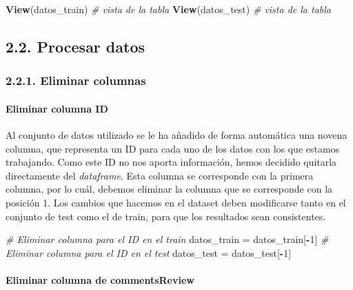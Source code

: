 \documentclass[spanish,]{article}
\newenvironment{Shaded}{\begin{snugshade}}{\end{snugshade}}
\newcommand{\CommentTok}[1]{\textcolor[rgb]{0.56,0.35,0.01}{\textit{#1}}}
\newcommand{\DecValTok}[1]{\textcolor[rgb]{0.00,0.00,0.81}{#1}}
\newcommand{\KeywordTok}[1]{\textcolor[rgb]{0.13,0.29,0.53}{\textbf{#1}}}
\newcommand{\NormalTok}[1]{#1}
\newcommand{\OperatorTok}[1]{\textcolor[rgb]{0.81,0.36,0.00}{\textbf{#1}}}
\newcommand{\StringTok}[1]{\textcolor[rgb]{0.31,0.60,0.02}{#1}}
\let\oldparagraph\paragraph
\renewcommand{\paragraph}[1]{\oldparagraph{#1}\mbox{}}
\begin{document}
\begin{Shaded}
\begin{Highlighting}[]
\KeywordTok{View}\NormalTok{(datos_train)    }\CommentTok{# vista de la tabla}
\KeywordTok{View}\NormalTok{(datos_test)    }\CommentTok{# vista de la tabla}
\end{Highlighting}
\end{Shaded}

\hypertarget{procesar-datos}{%
\subsection{2.2. Procesar datos}\label{procesar-datos}}

\hypertarget{eliminar-columnas}{%
\subsubsection{2.2.1. Eliminar columnas}\label{eliminar-columnas}}

\hypertarget{eliminar-columna-id}{%
\paragraph{Eliminar columna ID}\label{eliminar-columna-id}}

Al conjunto de datos utilizado se le ha añadido de forma automática una
novena columna, que representa un ID para cada uno de los datos con los
que estamos trabajando. Como este ID no nos aporta información, hemos
decidido quitarla directamente del \emph{dataframe}. Esta columna se
corresponde con la primera columna, por lo cuál, debemos eliminar la
columna que se corresponde con la posición 1. Los cambios que hacemos en
el dataset deben modificarse tanto en el conjunto de test como el de
train, para que los resultados sean consistentes.

\begin{Shaded}
\begin{Highlighting}[]
\CommentTok{# Eliminar columna para el ID en el train}
\NormalTok{datos_train =}\StringTok{ }\NormalTok{datos_train[}\OperatorTok{-}\DecValTok{1}\NormalTok{]}
\CommentTok{# Eliminar columna para el ID en el test}
\NormalTok{datos_test =}\StringTok{ }\NormalTok{datos_test[}\OperatorTok{-}\DecValTok{1}\NormalTok{]}
\end{Highlighting}
\end{Shaded}

\hypertarget{eliminar-columna-de-commentsreview}{%
\paragraph{Eliminar columna de
commentsReview}\label{eliminar-columna-de-commentsreview}}
\end{document}
